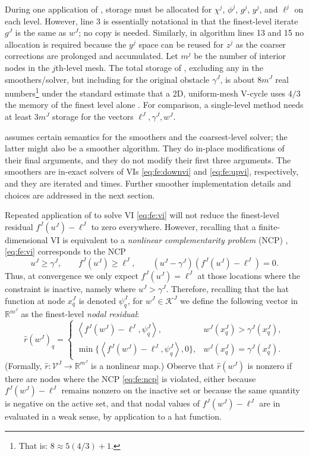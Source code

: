 \documentclass[letterpaper,final,12pt,reqno]{amsart}
\theoremstyle{cstyle}
\theoremstyle{cstyle*}
\theoremstyle{dstyle}
\numberwithin{equation}{section}
\numberwithin{figure}{section}
\numberwithin{table}{section}
\numberwithin{theorem}{section}
\newcommand{\RR}{\mathbb{R}}
\newcommand{\ip}[2]{\left<#1,#2\right>}
\begin{document}
During one application of , storage must be allocated for $\chi^j$, $\phi^j$, $g^j$, $y^j$, and $\ell^j$ on each level.  However, line 3 is essentially notational in that the finest-level iterate $g^J$ is the same as $w^J$; no copy is needed.  Similarly, in algorithm lines 13 and 15 no allocation is required because the $y^j$ space can be reused for $z^j$ as the coarser corrections are prolonged and accumulated.  Let $m^j$ be the number of interior nodes in the $j$th-level mesh.  The total storage of , excluding any in the smoothers/solver, but including for the original obstacle $\gamma^J$, is about $8 m^J$ real numbers\footnote{That is: $8\approx 5(4/3) + 1$.} under the standard estimate that a 2D, uniform-mesh V-cycle uses $4/3$ the memory of the finest level alone \cite[Section 2.4]{Trottenbergetal2001}.  For comparison, a single-level method needs at least $3 m^J$ storage for the vectors $\ell^J,\gamma^J,w^J$.

 assumes certain semantics for the smoothers and the coarsest-level solver; the latter might also be a smoother algorithm.  They do in-place modifications of their final arguments, and they do not modify their first three arguments.  The smoothers are in-exact solvers of VIs \eqref{eq:fe:downvi} and \eqref{eq:fe:upvi}, respectively, and they are iterated  and  times.  Further smoother implementation details and choices are addressed in the next section.

Repeated application of  to solve VI \eqref{eq:fe:vi} will not reduce the finest-level residual $f^J(u^J) - \ell^J$ to zero everywhere.  However, recalling that a finite-dimensional VI is equivalent to a \emph{nonlinear complementarity problem} (NCP) \cite{FacchineiPang2003}, \eqref{eq:fe:vi} corresponds to the NCP
\begin{equation}
u^J \ge \gamma^J, \qquad f^J(u^J) \ge \ell^J, \qquad (u^J - \gamma^J)\left(f^J(u^J) - \ell^J\right) = 0.  \label{eq:fe:ncp}
\end{equation}
Thus, at convergence we only expect $f^J(u^J) = \ell^J$ at those locations where the constraint is inactive, namely where $u^J > \gamma^J$.  Therefore, recalling that the hat function at node $x_q^J$ is denoted $\psi_q^J$, for $w^J \in \mathcal{K}^J$ we define the following vector in $\RR^{m^J}$ as the finest-level \emph{nodal residual}:
\begin{equation}
\hat r(w^J)_q = \begin{cases} \ip{f^J(w^J)-\ell^J}{\psi_q^J}, & w^J(x_q^J) > \gamma^J(x_q^J), \\
                                  \min\{\ip{f^J(w^J)-\ell^J}{\psi_q^J},0\}, & w^J(x_q^J) = \gamma^J(x_q^J). \end{cases} \label{eq:cpresidual}
\end{equation}
(Formally, $\hat r:\mathcal{V}^J \to \RR^{m^J}$ is a nonlinear map.)  Observe that $\hat r(w^J)$ is nonzero if there are nodes where the NCP \eqref{eq:fe:ncp} is violated, either because $f^J(w^J)-\ell^J$ remains nonzero on the inactive set or because the same quantity is negative on the active set, and that nodal values of $f^J(w^J)-\ell^J$ are in evaluated in a weak sense, by application to a hat function.
\end{document}

